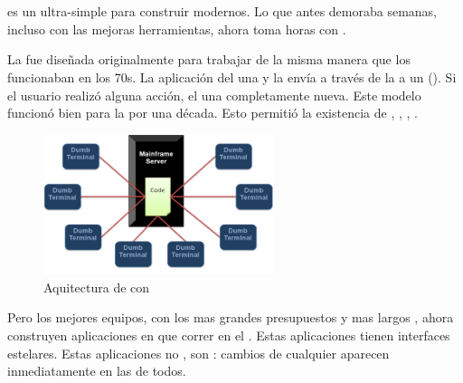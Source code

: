 
\section{\meteorNAME}


\meteorNAME es un \environmentPL ultra-simple para construir \websitesINT modernos. Lo que antes demoraba semanas, incluso con las mejoras herramientas, ahora toma horas con \meteorNAME.

La \webINT fue diseñada originalmente para trabajar de la misma manera que los \mainframesAS funcionaban en los 70s. La aplicación del \serverAS \rendered una \screen y la envía a través de la \networkINT a un \dumbterminal (). Si el usuario realizó alguna acción, el \serverAS \rendered una \screen completamente nueva. Este modelo funcionó bien para la \webINT por una década. Esto permitió la existencia de \lampNAME, \rails, \djangoNAME, \phpNAME.

\begin{figure}[h!]
	\centering
	\includegraphics[width=0.6\textwidth]{figuras/mainframeServer_dumbterminal.png}
	\caption{Aquitectura de \mainframeAS con \dumbterminal}
	\label{figure:mainframeServer_dumbterminal}
\end{figure}


Pero los mejores equipos, con los mas grandes presupuestos y mas largos \schedules, ahora construyen aplicaciones en \javaScriptNAME que correr en el \clientAS. Estas aplicaciones tienen interfaces estelares. Estas aplicaciones no \reload \pages, son \reactive: cambios de cualquier \clientAS aparecen inmediatamente en las \screen de todos.

